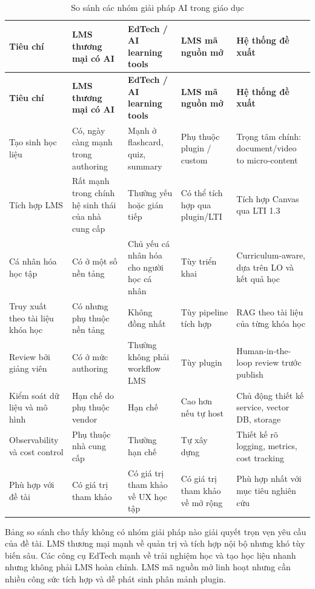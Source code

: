 \begingroup
\footnotesize
\setlength{\tabcolsep}{3pt}
\begin{longtable}{|p{2.4cm}|p{2.9cm}|p{3cm}|p{2.8cm}|p{3cm}|}
\caption{So sánh các nhóm giải pháp AI trong giáo dục}
\label{tab:so-sanh-giai-phap-ai-giao-duc}\\
\hline
\textbf{Tiêu chí} & \textbf{LMS thương mại có AI} & \textbf{EdTech / AI learning tools} & \textbf{LMS mã nguồn mở} & \textbf{Hệ thống đề xuất} \\
\hline
\endfirsthead
\hline
\textbf{Tiêu chí} & \textbf{LMS thương mại có AI} & \textbf{EdTech / AI learning tools} & \textbf{LMS mã nguồn mở} & \textbf{Hệ thống đề xuất} \\
\hline
\endhead
Tạo sinh học liệu & Có, ngày càng mạnh trong authoring & Mạnh ở flashcard, quiz, summary & Phụ thuộc plugin / custom & Trọng tâm chính: document/video to micro-content \\
\hline
Tích hợp LMS & Rất mạnh trong chính hệ sinh thái của nhà cung cấp & Thường yếu hoặc gián tiếp & Có thể tích hợp qua plugin/LTI & Tích hợp Canvas qua LTI 1.3 \\
\hline
Cá nhân hóa học tập & Có ở một số nền tảng & Chủ yếu cá nhân hóa cho người học cá nhân & Tùy triển khai & Curriculum-aware, dựa trên LO và kết quả học \\
\hline
Truy xuất theo tài liệu khóa học & Có nhưng phụ thuộc nền tảng & Không đồng nhất & Tùy pipeline tích hợp & RAG theo tài liệu của từng khóa học \\
\hline
Review bởi giảng viên & Có ở mức authoring & Thường không phải workflow LMS & Tùy plugin & Human-in-the-loop review trước publish \\
\hline
Kiểm soát dữ liệu và mô hình & Hạn chế do phụ thuộc vendor & Hạn chế & Cao hơn nếu tự host & Chủ động thiết kế service, vector DB, storage \\
\hline
Observability và cost control & Phụ thuộc nhà cung cấp & Thường hạn chế & Tự xây dựng & Thiết kế rõ logging, metrics, cost tracking \\
\hline
Phù hợp với đề tài & Có giá trị tham khảo & Có giá trị tham khảo về UX học tập & Có giá trị tham khảo về mở rộng & Phù hợp nhất với mục tiêu nghiên cứu \\
\hline
\end{longtable}
\endgroup

Bảng so sánh cho thấy không có nhóm giải pháp nào giải quyết trọn vẹn yêu cầu
của đề tài. LMS thương mại mạnh về quản trị và tích hợp nội bộ nhưng khó tùy
biến sâu. Các công cụ EdTech mạnh về trải nghiệm học và tạo học liệu nhanh
nhưng không phải LMS hoàn chỉnh. LMS mã nguồn mở linh hoạt nhưng cần nhiều công
sức tích hợp và dễ phát sinh phân mảnh plugin.

